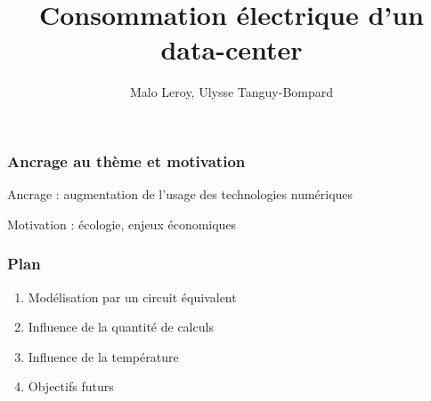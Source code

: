 \documentclass[a4paper,11pt]{beamer}
\title{Consommation électrique d'un data-center}
\author{Malo Leroy, Ulysse Tanguy-Bompard}
\begin{document}

\maketitle %


\begin{frame}
\frametitle{Ancrage au thème et motivation}
Ancrage : augmentation de l'usage des technologies numériques

Motivation : écologie, enjeux économiques
\end{frame}

\begin{frame}
    \frametitle{Plan}
    \begin{enumerate}
        \item Modélisation par un circuit équivalent
        \item Influence de la quantité de calculs
        \item Influence de la température
        \item Objectifs futurs
    \end{enumerate}
\end{frame}
\end{document}
